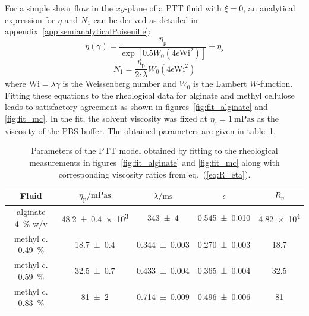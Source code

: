 \documentclass[a4paper,12pt]{scrartcl}
\newcommand{\RK}[1]{{\color{cyan}RK: #1}}
\newcommand{\SG}[1]{{\color{red}SG: #1}}
\begin{document}
For a simple shear flow in the $xy$-plane of a PTT fluid with $ \xi =0$, an analytical expression for $ \eta $ and $N_1$ can be derived as detailed in appendix~\ref{app:semianalyticalPoiseuille}:
	\begin{equation}
		\eta\left(\dot{\gamma}\right) = \frac{\eta_\text{p}}{\exp\left[0.5W_0\left(4\epsilon \mathrm{Wi}^2\right)\right]} + \eta_\text{s} \label{eq:shearEta}
	\end{equation}
	\begin{equation}
		N_1 = \frac{\eta_\text{p}}{2\epsilon\lambda}W_0\left(4\epsilon \mathrm{Wi}^2\right) \label{eq:shearN}
	\end{equation}
where $\mathrm{Wi} = \lambda\dot{\gamma}$ is the Weissenberg number and $W_0$ is the Lambert $W$-function.
Fitting these equations to the rheological data for alginate and methyl cellulose leads to satisfactory agreement as shown in figures~\ref{fig:fit_alginate} and \ref{fig:fit_mc}.
In the fit, the solvent viscosity was fixed at $\eta_\text{s} = \SI{1}{\milli\pascal\second}$ as the viscosity of the PBS buffer. 
The obtained parameters are given in table~\ref{tab:PTTparameters}.
	\begin{table}[H]
		\centering
		\begin{tabular}{c|c|c|c|c}
			Fluid & $\eta_\text{p}/\unit{\milli\pascal\second}$ & $\lambda/\unit{\milli\second}$ & $\epsilon$ & $R_\eta$ \\
			\hline
			alginate \SI{4}{\percent} w/v & \num{48.2\pm0.4e3} & \num{343 \pm 4} & \num{0.545 \pm 0.010} & \num{4.82e4} \\
			\rowcolor{secondaryBackground}
			methyl c. \SI{0.49}{\percent} & \num{18.7\pm0.4} & \num{0.344\pm0.003} & \num{0.270\pm0.003} & \num{18.7} \\
			methyl c. \SI{0.59}{\percent} & \num{32.5\pm0.7} & \num{0.433\pm0.004} & \num{0.365\pm0.004} & \num{32.5} \\
			\rowcolor{secondaryBackground}
			methyl c. \SI{0.83}{\percent} & \num{81\pm2} & \num{0.714\pm0.009} & \num{0.496\pm0.006} & \num{81}
		\end{tabular}
		\caption{Parameters of the PTT model obtained by fitting to the rheological measurements in figures~\ref{fig:fit_alginate} and \ref{fig:fit_mc} along with corresponding viscosity ratios from eq.~(\ref{eq:R_eta}).}
		\label{tab:PTTparameters}
	\end{table}
\end{document}
